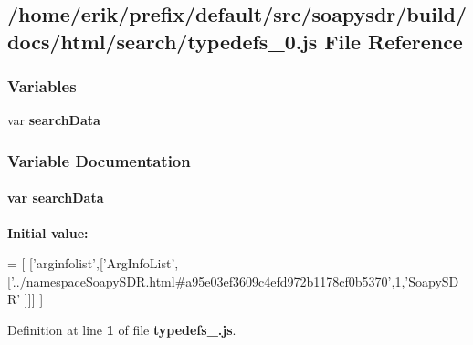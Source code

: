 \subsection{/home/erik/prefix/default/src/soapysdr/build/docs/html/search/typedefs\+\_\+0.js File Reference}
\label{typedefs__0_8js}
\subsubsection*{Variables}
\begin{DoxyCompactItemize}
\item 
var {\bf search\+Data}
\end{DoxyCompactItemize}


\subsubsection{Variable Documentation}
\paragraph[{search\+Data}]{\setlength{\rightskip}{0pt plus 5cm}var search\+Data}\label{typedefs__0_8js_ad01a7523f103d6242ef9b0451861231e}
{\bfseries Initial value\+:}
\begin{DoxyCode}
=
[
  [\textcolor{stringliteral}{'arginfolist'},[\textcolor{stringliteral}{'ArgInfoList'},[\textcolor{stringliteral}{'../namespaceSoapySDR.html#a95e03ef3609c4efd972b1178cf0b5370'},1,\textcolor{stringliteral}{'SoapySDR'}
      ]]]
]
\end{DoxyCode}


Definition at line {\bf 1} of file {\bf typedefs\+\_.\+js}.

